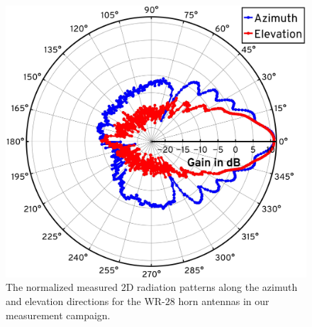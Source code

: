 \documentclass[10pt, twocolumn]{IEEEtran}
\begin{document}
{\begin{figure} [t]
    \centering
    \includegraphics[width=0.55\linewidth]{figs/antenna_patterns.pdf}
    \caption{The normalized measured $2$D radiation patterns along the azimuth and elevation directions for the WR-$28$ horn antennas in our measurement campaign.}
    \vspace{-6mm}
    \label{F4}
\end{figure}
}
\end{document}
